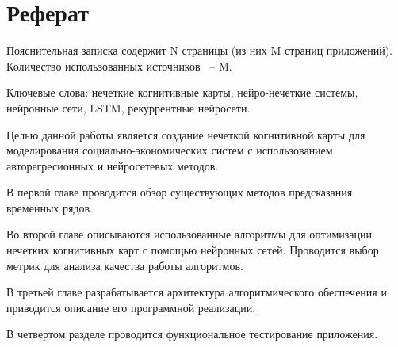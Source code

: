 \chapter*{Реферат}
\thispagestyle{plain}

Пояснительная записка содержит N страницы (из них M страниц приложений). Количество использованных источников ~-- M.

Ключевые слова: нечеткие когнитивные карты, нейро-нечеткие системы, нейронные сети, LSTM, рекуррентные нейросети.

Целью данной работы является создание нечеткой когнитивной карты для моделирования
социально-экономических систем с использованием авторегресионных и нейросетевых методов.

В первой главе проводится обзор существующих методов предсказания временных рядов.

Во второй главе описываются использованные алгоритмы для оптимизации нечетких
когнитивных карт с помощью нейронных сетей.
Проводится выбор метрик для анализа качества работы алгоритмов.

В третьей главе разрабатывается архитектура алгоритмического обеспечения
и приводится описание его программной реализации.

В четвертом разделе проводится функциональное тестирование приложения.
